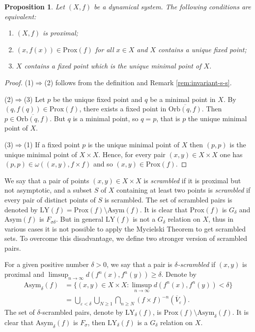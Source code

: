 \documentclass[reqno,a4paper,12pt]{amsart}
\newtheorem{prop}[thm]{Proposition}
\theoremstyle{definition}
\numberwithin{equation}{section}
\begin{document}
\begin{prop}
Let $(X,f)$ be a dynamical system. The following conditions are equivalent:
\begin{enumerate}
  \item $(X,f)$ is proximal;
  \item $(x,f(x))\in \mathrm{Prox}(f)$ for all $x\in X$ and $X$ contains a unique fixed point;
  \item $X$ contains a fixed point which is the unique minimal point of $X$.
\end{enumerate}
\end{prop}
\begin{proof}
(1)$\Rightarrow$(2) follows from the definition and Remark \ref{rem:invariant-s-s}.

(2)$\Rightarrow$(3) Let $p$ be the unique fixed point and $q$ be a minimal point in $X$.
By $(q,f(q))\in \mathrm{Prox}(f)$, there exists a fixed point in $\overline{{\mbox{Orb}}(q,f)}$.
Then $p\in \overline{{\mbox{Orb}}(q,f)}$. But $q$ is a minimal point, so $q=p$,
that is $p$ the unique minimal point of $X$.

(3)$\Rightarrow$(1)
If a fixed point $p$ is the unique minimal point of $X$ then $(p,p)$
is the unique minimal  point of $X \times X$. Hence, for every pair $(x, y) \in  X \times X$ one has
$(p, p) \in \omega((x, y),f\times f)$ and so $(x, y)\in \mathrm{Prox}(f)$.
\end{proof}

We say that a pair of points $(x,y)\in X\times X$ is \emph{scrambled} if it is proximal but not asymptotic,
and a subset $S$ of $X$ containing at least two points
is \emph{scrambled} if every pair of distinct points of $S$ is scrambled.
The set of scrambled pairs is denoted by $\mathrm{LY}(f)=\mathrm{Prox}(f)\setminus \mathrm{Asym}(f)$.
It is clear that $\mathrm{Prox}(f)$ is $G_\delta$ and $\mathrm{Asym}(f)$ is $F_{\sigma\delta}$.
But in general $\mathrm{LY}(f)$ is not a $G_\delta$ relation on $X$,
thus in various cases it is not possible to apply the Mycielski Theorem to get scrambled sets.
To overcome this disadvantage, we define two stronger version of scrambled pairs.

For a given positive number $\delta>0$, we say that a pair is \emph{$\delta$-scrambled}
if $(x,y)$ is proximal and $\limsup_{n\to\infty}d(f^n(x),f^n(y))\geq \delta$.
Denote by
\begin{align*}
  \mathrm{Asym}_\delta(f)&=\bigl\{(x,y)\in X\times X\colon \limsup_{n\to\infty} d(f^n(x),f^n(y))<\delta\bigr\}\\
                  &=\bigcup_{\varepsilon<\delta}\bigcup_{N\geq 1}
                  \bigcap_{n\geq N} (f\times f)^{-n} (\overline{V}\!_{\varepsilon}).
\end{align*}
The set of $\delta$-scrambled pairs, denote by $\mathrm{LY}_\delta(f)$,
is  $\mathrm{Prox}(f)\setminus \mathrm{Asym}_\delta(f)$.
It is clear that $\mathrm{Asym}_\delta(f)$ is $F_\sigma$, then $\mathrm{LY}_\delta(f)$ is a $G_\delta$ relation on $X$.
\end{document}
